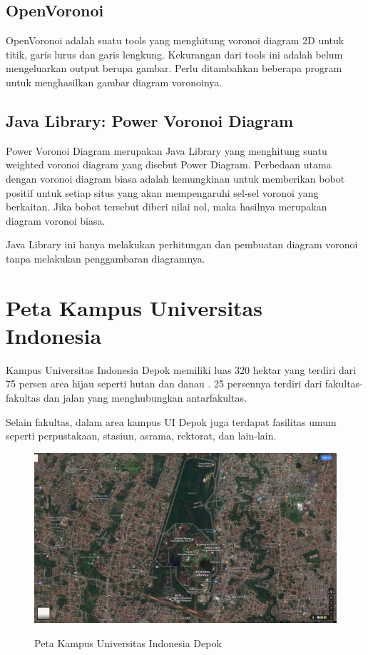 \subsection{OpenVoronoi}

OpenVoronoi adalah suatu tools yang menghitung voronoi diagram 2D untuk titik, garis lurus dan garis lengkung. Kekurangan dari tools ini adalah belum mengeluarkan output berupa gambar. Perlu ditambahkan beberapa program untuk menghasilkan gambar diagram voronoinya. \cite{open.voronoi}

\subsection{Java Library: Power Voronoi Diagram}

Power Voronoi Diagram merupakan Java Library yang menghitung suatu weighted voronoi diagram yang disebut Power Diagram. Perbedaan utama dengan voronoi diagram biasa adalah kemungkinan untuk memberikan bobot positif untuk setiap situs yang akan mempengaruhi sel-sel voronoi yang berkaitan. Jika bobot tersebut diberi nilai nol, maka hasilnya merupakan diagram voronoi biasa. \cite{power.voronoi.diagram}

Java Library ini hanya melakukan perhitungan dan pembuatan diagram voronoi tanpa melakukan penggambaran diagramnya.

\section{Peta Kampus Universitas Indonesia}\label{sec:petaUI}

Kampus Universitas Indonesia Depok memiliki luas 320 hektar yang terdiri dari 75 persen area hijau seperti hutan dan danau \cite{ui}. 25 persennya terdiri dari fakultas-fakultas dan jalan yang menghubungkan antarfakultas. 

Selain fakultas, dalam area kampus UI Depok juga terdapat fasilitas umum seperti perpustakaan, stasiun, asrama, rektorat, dan lain-lain.

\begin{figure}
	\centering
	\includegraphics[width=14cm]{pics/ui-map.png}
	\caption{Peta Kampus Universitas Indonesia Depok}
	\label{fig:UImap}
	\cite{ui.map}
\end{figure}

